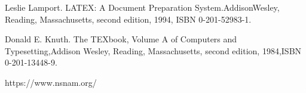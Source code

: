 \documentclass[a4paper,12pt]{report}
\begin{document}
\begin{thebibliography}{99}
\songti {} 	
	Leslie Lamport. LATEX: A Document Preparation System.AddisonWesley, Reading, Massachusetts, second edition, 1994, ISBN 0-201-52983-1.
	
	Donald E. Knuth. The TEXbook, Volume A of Computers and Typesetting,Addison Wesley, Reading, Massachusetts, second edition, 1984,ISBN 0-201-13448-9.

	https://www.nsnam.org/
	
\end{thebibliography}

\end{document}
